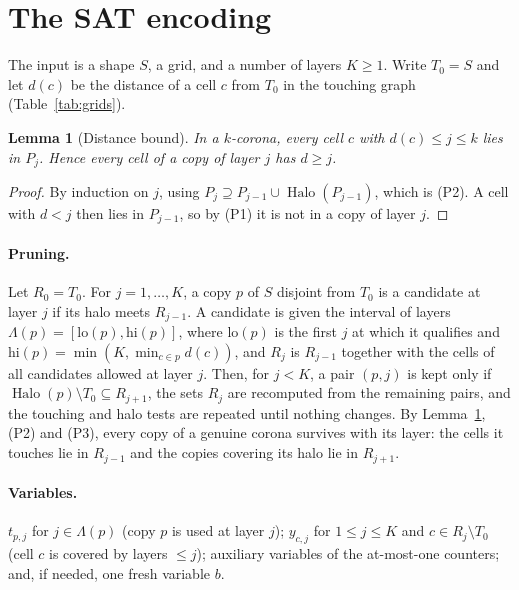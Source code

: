 \documentclass[10pt,a4paper]{article}
\newtheorem{lemma}[theorem]{Lemma}
\theoremstyle{definition}
\theoremstyle{remark}
\newcommand{\Halo}{\operatorname{Halo}}
\begin{document}
\section{The SAT encoding}
\label{sec:encoding}
The input is a shape $S$, a grid, and a number of layers $K\geq1$. Write
$T_0=S$ and let $d(c)$ be the distance of a cell $c$ from $T_0$ in the
touching graph (Table~\ref{tab:grids}).

\begin{lemma}[Distance bound]
\label{lem:A}
In a $k$-corona, every cell $c$ with $d(c)\leq j\leq k$ lies in $P_j$.
Hence every cell of a copy of layer $j$ has $d\geq j$.
\end{lemma}
\begin{proof}
By induction on $j$, using $P_j\supseteq P_{j-1}\cup\Halo(P_{j-1})$,
which is (P2). A cell with $d<j$ then lies in $P_{j-1}$, so by (P1) it is
not in a copy of layer $j$.
\end{proof}

\paragraph{Pruning.}
Let $R_0=T_0$. For $j=1,\dots,K$, a copy $p$ of $S$ disjoint from $T_0$
is a candidate at layer $j$ if its halo meets $R_{j-1}$. A candidate is
given the interval of layers $\Lambda(p)=[\mathrm{lo}(p),\mathrm{hi}(p)]$,
where $\mathrm{lo}(p)$ is the first $j$ at which it qualifies and
$\mathrm{hi}(p)=\min(K,\min_{c\in p}d(c))$, and $R_j$ is $R_{j-1}$
together with the cells of all candidates allowed at layer $j$. Then,
for $j<K$, a pair $(p,j)$ is kept only if $\Halo(p)\setminus T_0\subseteq
R_{j+1}$, the sets $R_j$ are recomputed from the remaining pairs, and the
touching and halo tests are repeated until nothing changes. By
Lemma~\ref{lem:A}, (P2) and (P3), every copy of a genuine corona survives
with its layer: the cells it touches lie in $R_{j-1}$ and the copies
covering its halo lie in $R_{j+1}$.

\paragraph{Variables.}
$t_{p,j}$ for $j\in\Lambda(p)$ (copy $p$ is used at layer $j$);
$y_{c,j}$ for $1\leq j\leq K$ and $c\in R_j\setminus T_0$ (cell $c$ is
covered by layers $\leq j$); auxiliary variables of the at-most-one
counters; and, if needed, one fresh variable $b$.
\end{document}
